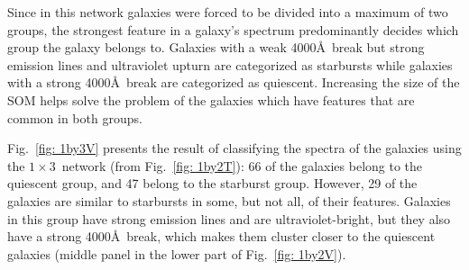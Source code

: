             Since in this network galaxies were forced to be divided into a maximum of two groups, the strongest feature in a galaxy's spectrum predominantly decides which group the galaxy belongs to.
            Galaxies with a weak 4000\AA~break but strong emission lines and ultraviolet upturn are categorized as starbursts while galaxies with a strong 4000\AA~break are categorized as quiescent.
            Increasing the size of the SOM helps solve the problem of the galaxies which have features that are common in both groups.
            
            Fig.~\ref{fig: 1by3V} presents the result of classifying the spectra of the galaxies using the $1\times3$~network (from Fig.~\ref{fig: 1by2T}): 66 of the galaxies belong to the quiescent group, and 47 belong to the starburst group. 
            However, 29 of the galaxies are similar to starbursts in some, but not all, of their features. 
            Galaxies in this group have strong emission lines and are ultraviolet-bright, but they also have a strong 4000\AA~break, which makes them cluster closer to the quiescent galaxies (middle panel in the lower part of Fig.~\ref{fig: 1by2V}).

